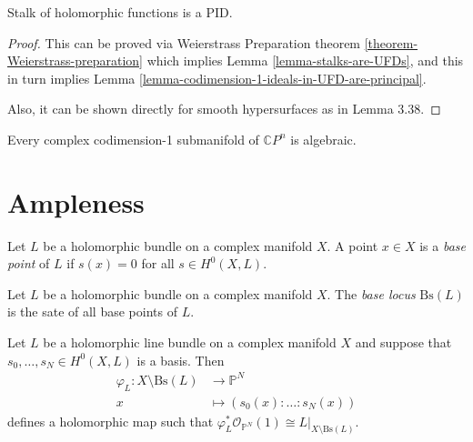 \begin{proposition}
\label{proposition-stalk-is-PID}
Stalk of holomorphic functions is a PID.
\end{proposition}

\begin{proof}
This can be proved via Weierstrass Preparation theorem
\ref{theorem-Weierstrass-preparation} which implies
 Lemma \ref{lemma-stalks-are-UFDs}, and this in turn implies Lemma 
\ref{lemma-codimension-1-ideals-in-UFD-are-principal}.

Also, it can be shown directly for smooth hypersurfaces
 as in \cite{lec} Lemma 3.38.
\end{proof}

\begin{theorem}
\label{theorem-Chow-for-hypersurfaces}
Every complex codimension-1 submanifold of $\mathbb{C}P^{n}$ is algebraic.
\end{theorem}

\section{Ampleness}
\label{section-ampleness}

\begin{definition}
\label{definition-base-point}
\begin{reference}
\cite[Definition 2.3.25]{huc}
\end{reference}
Let $L$ be a holomorphic bundle on a complex manifold $X$. A point $x \in X$ is
a {\it base point} of $L$ if $s(x)=0$ for all $s\in H^{0}(X,L)$. 
\end{definition}

\begin{definition}
\label{definition-base-locus}
\begin{reference}
\cite[Definition 2.3.25]{huc}
\end{reference}
Let $L$ be a holomorphic bundle on a complex manifold $X$. 
The {\it base locus} $\text{Bs}(L)$ is the sate of all base points of $L$.
\end{definition}

\begin{proposition}
\label{proposition-canonical-map}
\begin{reference}
\cite[Proposition 2.3.26]{huc}
\end{reference}
Let $L$ be a holomorphic line bundle on a complex manifold $X$ and suppose that
$s_0,\ldots,s_N\in H^{0}(X,L)$ is a basis. Then
\begin{align*}
\varphi_L: X\setminus\text{Bs}(L) &\longrightarrow \mathbb{P}^N \\
x &\longmapsto (s_0(x):\ldots:s_N(x))
\end{align*}
defines a holomorphic map such that $\varphi^*
_L\mathcal{O}_{\mathbb{P}^N}(1)\cong L|_{X\setminus\text{Bs}(L)}$.
\end{proposition}

